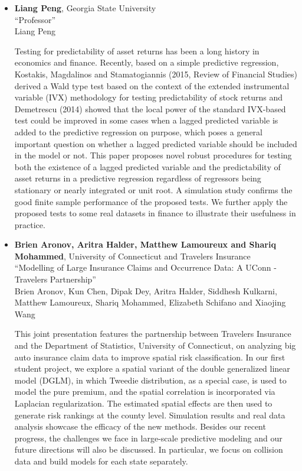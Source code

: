 \begin{itemize}
\item \textbf{Liang Peng}, Georgia State University \\
``Professor'' \\
Liang Peng


Testing for predictability of asset returns has been a long history in economics and finance. Recently, based on a simple predictive regression, Kostakis, Magdalinos and Stamatogiannis (2015,  Review of Financial Studies) derived a Wald type test based on the context of the extended instrumental variable (IVX) methodology for testing predictability of stock returns and Demetrescu (2014) showed that the local power of the standard IVX-based test could be improved in some cases when a lagged predicted variable is added to the predictive regression on purpose, which poses a general important question on whether a lagged predicted variable should be included in the model or not. This paper proposes novel robust   procedures for testing both the existence of a lagged predicted variable and the predictability of asset returns in a predictive regression regardless of regressors being stationary or nearly integrated or unit root. A simulation study confirms the good finite sample performance of the proposed tests. We further apply the proposed tests to some real datasets in finance to illustrate their usefulness in practice.

\item \textbf{Brien Aronov, Aritra Halder, Matthew Lamoureux and Shariq Mohammed}, University of Connecticut and Travelers Insurance \\
``Modelling of Large Insurance Claims and Occurrence Data: A UConn - Travelers Partnership'' \\
Brien Aronov, Kun Chen, Dipak Dey, Aritra Halder, Siddhesh Kulkarni, Matthew Lamoureux, Shariq Mohammed, Elizabeth Schifano and Xiaojing Wang


This joint presentation features the partnership between Travelers Insurance and the Department of Statistics, University of Connecticut, on analyzing big auto insurance claim data to improve spatial risk classification. In our first student project, we explore a spatial variant of the double generalized linear model (DGLM), in which Tweedie distribution, as a special case, is used to model the pure premium, and the spatial correlation is incorporated via Laplacian regularization. The estimated spatial effects are then used to generate risk rankings at the county level. Simulation results and real data analysis showcase the efficacy of the new methods. Besides our recent progress, the challenges we face in large-scale predictive modeling and our future directions will also be discussed. In particular, we focus on collision data and build models for each state separately.


\end{itemize}
